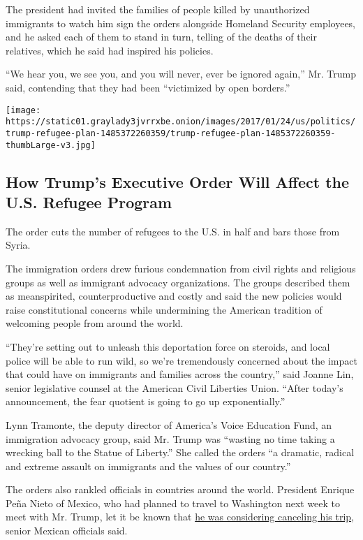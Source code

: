 The president had invited the families of people killed by unauthorized
immigrants to watch him sign the orders alongside Homeland Security
employees, and he asked each of them to stand in turn, telling of the
deaths of their relatives, which he said had inspired his policies.

``We hear you, we see you, and you will never, ever be ignored again,''
Mr. Trump said, contending that they had been ``victimized by open
borders.''

\href{https://www.nytimes3xbfgragh.onion/interactive/2017/01/25/us/politics/trump-refugee-plan.html}{}

\texttt{[image: https://static01.graylady3jvrrxbe.onion/images/2017/01/24/us/politics/trump-refugee-plan-1485372260359/trump-refugee-plan-1485372260359-thumbLarge-v3.jpg]}

\hypertarget{how-trumps-executive-order-will-affect-the-us-refugee-program}{%
\subsection{How Trump's Executive Order Will Affect the U.S. Refugee
Program}\label{how-trumps-executive-order-will-affect-the-us-refugee-program}}

The order cuts the number of refugees to the U.S. in half and bars those
from Syria.

The immigration orders drew furious condemnation from civil rights and
religious groups as well as immigrant advocacy organizations. The groups
described them as meanspirited, counterproductive and costly and said
the new policies would raise constitutional concerns while undermining
the American tradition of welcoming people from around the world.

``They're setting out to unleash this deportation force on steroids, and
local police will be able to run wild, so we're tremendously concerned
about the impact that could have on immigrants and families across the
country,'' said Joanne Lin, senior legislative counsel at the American
Civil Liberties Union. ``After today's announcement, the fear quotient
is going to go up exponentially.''

Lynn Tramonte, the deputy director of America's Voice Education Fund, an
immigration advocacy group, said Mr. Trump was ``wasting no time taking
a wrecking ball to the Statue of Liberty.'' She called the orders ``a
dramatic, radical and extreme assault on immigrants and the values of
our country.''

The orders also rankled officials in countries around the world.
President Enrique Peña Nieto of Mexico, who had planned to travel to
Washington next week to meet with Mr. Trump, let it be known that
\href{https://www.nytimes3xbfgragh.onion/2017/01/25/world/americas/trump-mexico-border-wall.html}{he
was considering canceling his trip}, senior Mexican officials said.

